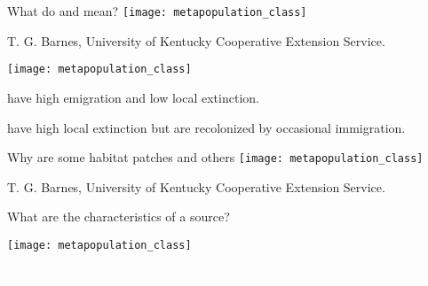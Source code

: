 \documentclass[t]{beamer}
\begin{document}
%
\begin{frame}{What do  and  mean?}
	\centering
	\texttt{[image: metapopulation\_class]}
	
	\vfilll
	
	\hfill \tiny \textcopyright T. G. Barnes, University of Kentucky Cooperative Extension Service.
\end{frame}
%
\begin{frame}[c]{}
	\begin{multicols}{2}
		\onslide<1->\texttt{[image: metapopulation\_class]}


	\columnbreak
		\hangpara {} have high emigration and low local extinction.
		
		\hangpara {} have high local extinction but are recolonized by occasional immigration. 
	
	\end{multicols}

\end{frame}
%
\begin{frame}{Why are some habitat patches  and others }
	\centering
	\texttt{[image: metapopulation\_class]}

	\vfilll
	
	\hfill \tiny \textcopyright T. G. Barnes, University of Kentucky Cooperative Extension Service.
	
\end{frame}
%
\begin{frame}[t]{What are the characteristics of a source?}
	\begin{minipage}{0.5\textwidth}
		\begin{center}
			\vspace{1\baselineskip}
			\texttt{[image: metapopulation\_class]}
		\end{center}
	\end{minipage}\begin{minipage}{0.5\textwidth}
		\flushleft
		
		\hangpara \textcolor{white}{A}\vspace{-1\baselineskip}
		
		\hangpara \makebox[0.8\textwidth]{\hrulefill}
		
		\hangpara \makebox[0.8\textwidth]{\hrulefill}
		
		\hangpara \makebox[0.8\textwidth]{\hrulefill}
		
		\hangpara \makebox[0.8\textwidth]{\hrulefill}
		
	\end{minipage}	
\end{frame}
\end{document}
